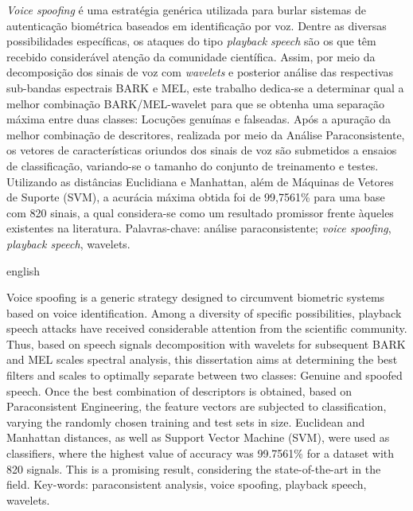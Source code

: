 \begin{resumo}
	\par \textit{Voice spoofing} é uma estratégia genérica utilizada para burlar sistemas de autenticação biométrica baseados em identificação por voz. Dentre as diversas possibilidades específicas, os ataques do tipo \textit{playback speech} são os que têm recebido considerável atenção da comunidade científica. Assim, por meio da decomposição dos sinais de voz com \textit{wavelets} e posterior análise das respectivas sub-bandas espectrais BARK e MEL, este trabalho dedica-se a determinar qual a melhor combinação BARK/MEL-wavelet para que se obtenha uma separação máxima entre duas classes: Locuções genuínas e falseadas. Após a apuração da melhor combinação de descritores, realizada por meio da Análise Paraconsistente, os vetores de características oriundos dos sinais de voz são submetidos a ensaios de classificação, variando-se o tamanho do conjunto de treinamento e testes. Utilizando as distâncias Euclidiana e Manhattan, além de Máquinas de Vetores de Suporte (SVM), a acurácia máxima obtida foi de 99,7561\% para uma base com 820 sinais, a qual considera-se como um resultado promissor frente àqueles existentes na literatura.\newline\newline
	Palavras-chave: análise paraconsistente; \textit{voice spoofing}, \textit{playback speech}, wavelets.
\end{resumo}

\begin{resumo}[Abstract]
	\begin{otherlanguage*}{english}
		\par Voice spoofing is a generic strategy designed to circumvent biometric systems based on voice identification. Among a diversity of specific possibilities, playback speech attacks have received considerable attention from the scientific community. Thus, based on speech signals decomposition with wavelets for subsequent BARK and MEL scales spectral analysis, this dissertation aims at determining the best filters and scales to optimally separate between two classes: Genuine and spoofed speech. Once the best combination of descriptors is obtained, based on Paraconsistent Engineering, the feature vectors are subjected to classification, varying the randomly chosen training and test sets in size. Euclidean and Manhattan distances, as well as Support Vector Machine (SVM), were used as classifiers, where the highest value of accuracy was 99.7561\% for a dataset with 820 signals. This is a promising result, considering the state-of-the-art in the field. \newline\newline
		Key-words: paraconsistent analysis, voice spoofing, playback speech, wavelets.
	\end{otherlanguage*}
\end{resumo}
